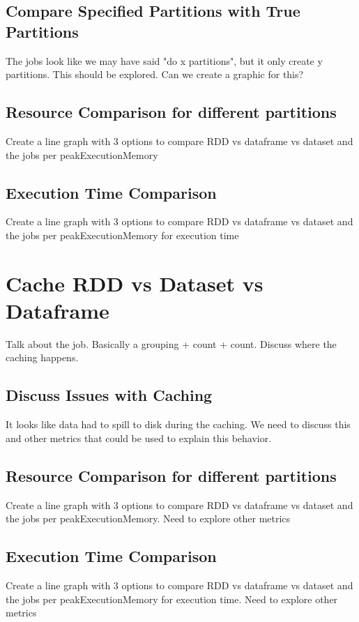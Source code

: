 \documentclass[conference]{IEEEtran}
\begin{document}
\subsection{Compare Specified Partitions with True Partitions}
The jobs look like we may have said "do x partitions", but it only create y partitions. This should be explored.
Can we create a graphic for this?

\subsection{Resource Comparison for different partitions}
Create a line graph with 3 options to compare RDD vs dataframe vs dataset and the jobs per peakExecutionMemory

\subsection{Execution Time Comparison}
Create a line graph with 3 options to compare RDD vs dataframe vs dataset and the jobs per peakExecutionMemory for execution time


\section{Cache RDD vs Dataset vs Dataframe}
Talk about the job. Basically a grouping + count + count.  Discuss where the caching happens.

\subsection{Discuss Issues with Caching}
It looks like data had to spill to disk during the caching. We need to discuss this and other metrics that could be used
to explain this behavior.

\subsection{Resource Comparison for different partitions}
Create a line graph with 3 options to compare RDD vs dataframe vs dataset and the jobs per peakExecutionMemory.  Need to explore other metrics

\subsection{Execution Time Comparison}
Create a line graph with 3 options to compare RDD vs dataframe vs dataset and the jobs per peakExecutionMemory for execution time. Need to explore other metrics
\end{document}
